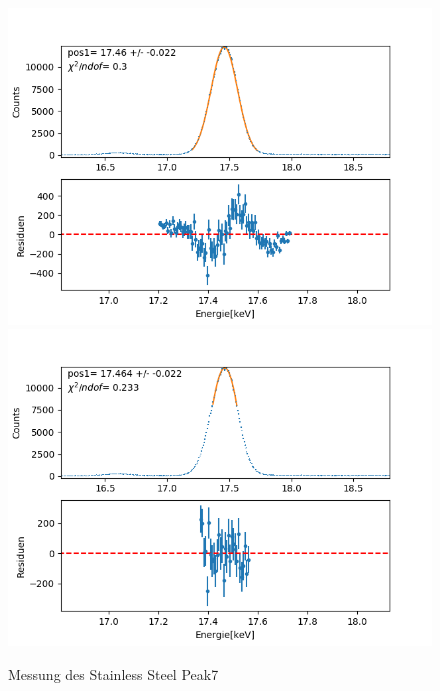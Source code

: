 \documentclass[12pt,a4paper]{article}
\begin{document}
\begin{figure}[H]
\centering
\includegraphics[scale=0.49]{Bilder/roentgen_spektren/stahl/rub7_1.png}
\includegraphics[scale=0.49]{Bilder/roentgen_spektren/stahl/rub7_2.png}
\caption{Messung des Stainless Steel Peak7}
\end{figure}
\end{document}
